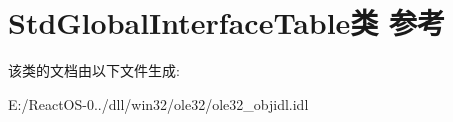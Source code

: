 \hypertarget{class_std_global_interface_table}{}\section{Std\+Global\+Interface\+Table类 参考}
\label{class_std_global_interface_table}


该类的文档由以下文件生成\+:\begin{DoxyCompactItemize}
\item 
E\+:/\+React\+O\+S-\/0../dll/win32/ole32/ole32\+\_\+objidl.\+idl\end{DoxyCompactItemize}
